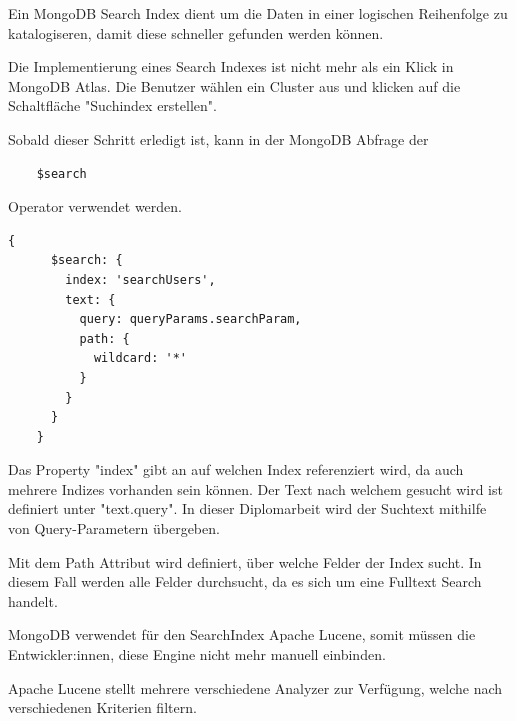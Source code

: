 Ein MongoDB Search Index dient um die Daten in einer logischen Reihenfolge zu katalogiseren, damit diese schneller gefunden werden können.

Die Implementierung eines Search Indexes ist nicht mehr als ein Klick in MongoDB Atlas. Die Benutzer wählen ein Cluster aus und klicken auf die Schaltfläche "Suchindex erstellen".

Sobald dieser Schritt erledigt ist, kann in der MongoDB Abfrage der 

\begin{lstlisting}
    $search 
\end{lstlisting}

Operator verwendet werden.

\begin{lstlisting}[caption=Implementierung Full-Text-Search]
    {
      $search: {
        index: 'searchUsers',
        text: {
          query: queryParams.searchParam,
          path: {
            wildcard: '*'
          }
        }
      }
    }
\end{lstlisting}

Das Property "index" gibt an auf welchen Index referenziert wird, da auch mehrere Indizes vorhanden sein können. 
Der Text nach welchem gesucht wird ist definiert unter "text.query". In dieser Diplomarbeit wird der Suchtext mithilfe von Query-Parametern übergeben.

Mit dem Path Attribut wird definiert, über welche Felder der Index sucht. In diesem Fall werden alle Felder durchsucht, da es sich um eine Fulltext Search handelt.

MongoDB verwendet für den SearchIndex Apache Lucene, somit müssen die Entwickler:innen, diese Engine nicht mehr manuell einbinden. 

Apache Lucene stellt mehrere verschiedene Analyzer zur Verfügung, welche nach verschiedenen Kriterien filtern.

